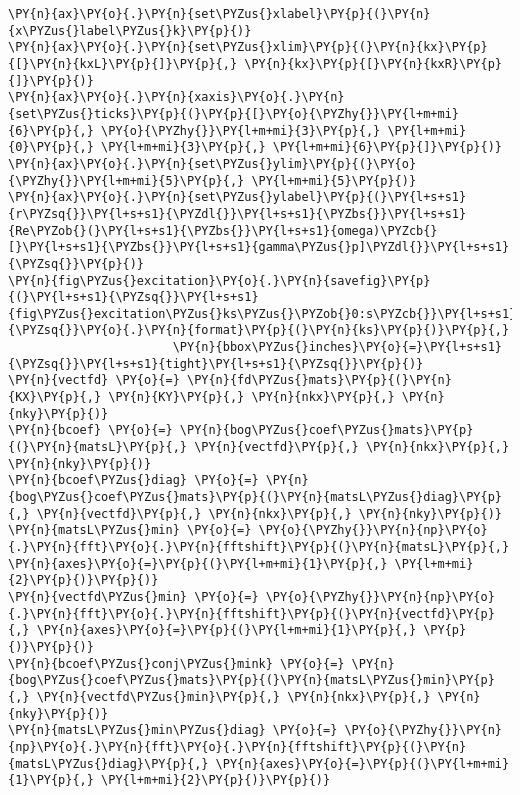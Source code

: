 \begin{Verbatim}[commandchars=\\\{\}]
\PY{n}{ax}\PY{o}{.}\PY{n}{set\PYZus{}xlabel}\PY{p}{(}\PY{n}{x\PYZus{}label\PYZus{}k}\PY{p}{)}
\PY{n}{ax}\PY{o}{.}\PY{n}{set\PYZus{}xlim}\PY{p}{(}\PY{n}{kx}\PY{p}{[}\PY{n}{kxL}\PY{p}{]}\PY{p}{,} \PY{n}{kx}\PY{p}{[}\PY{n}{kxR}\PY{p}{]}\PY{p}{)}
\PY{n}{ax}\PY{o}{.}\PY{n}{xaxis}\PY{o}{.}\PY{n}{set\PYZus{}ticks}\PY{p}{(}\PY{p}{[}\PY{o}{\PYZhy{}}\PY{l+m+mi}{6}\PY{p}{,} \PY{o}{\PYZhy{}}\PY{l+m+mi}{3}\PY{p}{,} \PY{l+m+mi}{0}\PY{p}{,} \PY{l+m+mi}{3}\PY{p}{,} \PY{l+m+mi}{6}\PY{p}{]}\PY{p}{)}
\PY{n}{ax}\PY{o}{.}\PY{n}{set\PYZus{}ylim}\PY{p}{(}\PY{o}{\PYZhy{}}\PY{l+m+mi}{5}\PY{p}{,} \PY{l+m+mi}{5}\PY{p}{)}
\PY{n}{ax}\PY{o}{.}\PY{n}{set\PYZus{}ylabel}\PY{p}{(}\PY{l+s+s1}{r\PYZsq{}}\PY{l+s+s1}{\PYZdl{}}\PY{l+s+s1}{\PYZbs{}}\PY{l+s+s1}{Re\PYZob{}(}\PY{l+s+s1}{\PYZbs{}}\PY{l+s+s1}{omega)\PYZcb{}[}\PY{l+s+s1}{\PYZbs{}}\PY{l+s+s1}{gamma\PYZus{}p]\PYZdl{}}\PY{l+s+s1}{\PYZsq{}}\PY{p}{)}
\PY{n}{fig\PYZus{}excitation}\PY{o}{.}\PY{n}{savefig}\PY{p}{(}\PY{l+s+s1}{\PYZsq{}}\PY{l+s+s1}{fig\PYZus{}excitation\PYZus{}ks\PYZus{}\PYZob{}0:s\PYZcb{}}\PY{l+s+s1}{\PYZsq{}}\PY{o}{.}\PY{n}{format}\PY{p}{(}\PY{n}{ks}\PY{p}{)}\PY{p}{,}
                       \PY{n}{bbox\PYZus{}inches}\PY{o}{=}\PY{l+s+s1}{\PYZsq{}}\PY{l+s+s1}{tight}\PY{l+s+s1}{\PYZsq{}}\PY{p}{)}
\PY{n}{vectfd} \PY{o}{=} \PY{n}{fd\PYZus{}mats}\PY{p}{(}\PY{n}{KX}\PY{p}{,} \PY{n}{KY}\PY{p}{,} \PY{n}{nkx}\PY{p}{,} \PY{n}{nky}\PY{p}{)}
\PY{n}{bcoef} \PY{o}{=} \PY{n}{bog\PYZus{}coef\PYZus{}mats}\PY{p}{(}\PY{n}{matsL}\PY{p}{,} \PY{n}{vectfd}\PY{p}{,} \PY{n}{nkx}\PY{p}{,} \PY{n}{nky}\PY{p}{)}
\PY{n}{bcoef\PYZus{}diag} \PY{o}{=} \PY{n}{bog\PYZus{}coef\PYZus{}mats}\PY{p}{(}\PY{n}{matsL\PYZus{}diag}\PY{p}{,} \PY{n}{vectfd}\PY{p}{,} \PY{n}{nkx}\PY{p}{,} \PY{n}{nky}\PY{p}{)}
\PY{n}{matsL\PYZus{}min} \PY{o}{=} \PY{o}{\PYZhy{}}\PY{n}{np}\PY{o}{.}\PY{n}{fft}\PY{o}{.}\PY{n}{fftshift}\PY{p}{(}\PY{n}{matsL}\PY{p}{,} \PY{n}{axes}\PY{o}{=}\PY{p}{(}\PY{l+m+mi}{1}\PY{p}{,} \PY{l+m+mi}{2}\PY{p}{)}\PY{p}{)}
\PY{n}{vectfd\PYZus{}min} \PY{o}{=} \PY{o}{\PYZhy{}}\PY{n}{np}\PY{o}{.}\PY{n}{fft}\PY{o}{.}\PY{n}{fftshift}\PY{p}{(}\PY{n}{vectfd}\PY{p}{,} \PY{n}{axes}\PY{o}{=}\PY{p}{(}\PY{l+m+mi}{1}\PY{p}{,} \PY{p}{)}\PY{p}{)}
\PY{n}{bcoef\PYZus{}conj\PYZus{}mink} \PY{o}{=} \PY{n}{bog\PYZus{}coef\PYZus{}mats}\PY{p}{(}\PY{n}{matsL\PYZus{}min}\PY{p}{,} \PY{n}{vectfd\PYZus{}min}\PY{p}{,} \PY{n}{nkx}\PY{p}{,} \PY{n}{nky}\PY{p}{)}
\PY{n}{matsL\PYZus{}min\PYZus{}diag} \PY{o}{=} \PY{o}{\PYZhy{}}\PY{n}{np}\PY{o}{.}\PY{n}{fft}\PY{o}{.}\PY{n}{fftshift}\PY{p}{(}\PY{n}{matsL\PYZus{}diag}\PY{p}{,} \PY{n}{axes}\PY{o}{=}\PY{p}{(}\PY{l+m+mi}{1}\PY{p}{,} \PY{l+m+mi}{2}\PY{p}{)}\PY{p}{)}

\end{Verbatim}
